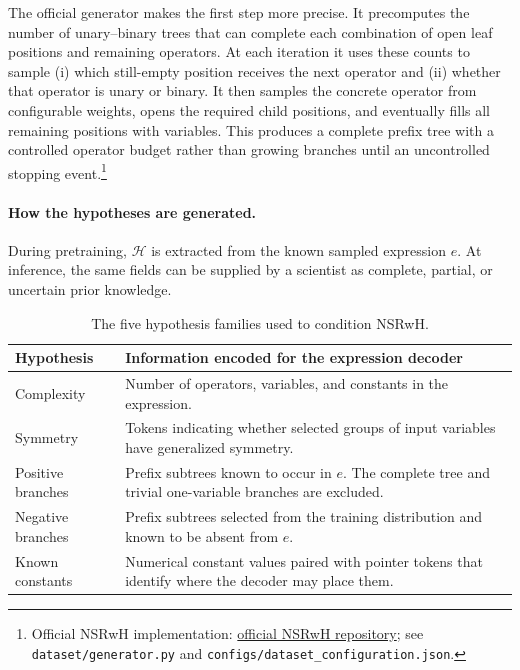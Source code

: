 The official generator makes the first step more precise. It precomputes the
number of unary--binary trees that can complete each combination of open leaf
positions and remaining operators. At each iteration it uses these counts to
sample (i) which still-empty position receives the next operator and (ii)
whether that operator is unary or binary. It then samples the concrete operator
from configurable weights, opens the required child positions, and eventually
fills all remaining positions with variables. This produces a complete prefix
tree with a controlled operator budget rather than growing branches until an
uncontrolled stopping event.\footnote{Official NSRwH implementation:
\href{https://github.com/SymposiumOrganization/ControllableNeuralSymbolicRegression}
{official NSRwH repository}; see \texttt{dataset/generator.py} and
\texttt{configs/dataset\_configuration.json}.}

\paragraph{How the hypotheses are generated.}
During pretraining, $\mathcal H$ is extracted from the known sampled expression
$e$. At inference, the same fields can be supplied by a scientist as complete,
partial, or uncertain prior knowledge.

\begin{table}[tbp]
\centering
\small
\renewcommand{\arraystretch}{1.08}
\begin{tabular}{@{}p{}p{}@{}}
\toprule
Hypothesis & Information encoded for the expression decoder \\
\midrule
Complexity & Number of operators, variables, and constants in the expression. \\
Symmetry & Tokens indicating whether selected groups of input variables have
generalized symmetry. \\
Positive branches & Prefix subtrees known to occur in $e$. The complete tree
and trivial one-variable branches are excluded. \\
Negative branches & Prefix subtrees selected from the training distribution
and known to be absent from $e$. \\
Known constants & Numerical constant values paired with pointer tokens that
identify where the decoder may place them. \\
\bottomrule
\end{tabular}
\caption{The five hypothesis families used to condition NSRwH.}
\label{tab:nsrwh-hypotheses}
\end{table}

